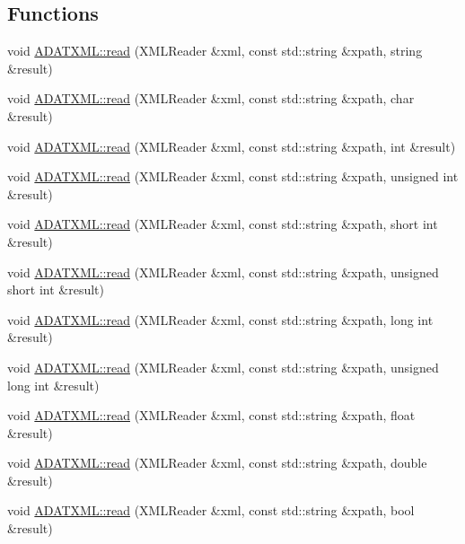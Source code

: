 \subsection*{Functions}
\begin{DoxyCompactItemize}
\item 
void \mbox{\hyperlink{namespaceADATXML_a569ed4d03ded383a8aaf0ce90b7c80ba}{A\+D\+A\+T\+X\+M\+L\+::read}} (X\+M\+L\+Reader \&xml, const std\+::string \&xpath, string \&result)
\item 
void \mbox{\hyperlink{group__io_ga42921d40fdc242e0dc6200a66c1eb928}{A\+D\+A\+T\+X\+M\+L\+::read}} (X\+M\+L\+Reader \&xml, const std\+::string \&xpath, char \&result)
\item 
void \mbox{\hyperlink{group__io_ga0e33dbc1e3ebc33bfb45ef5f1b390e45}{A\+D\+A\+T\+X\+M\+L\+::read}} (X\+M\+L\+Reader \&xml, const std\+::string \&xpath, int \&result)
\item 
void \mbox{\hyperlink{group__io_ga8237b5b121cf20d4d72ebe0396ad5fc7}{A\+D\+A\+T\+X\+M\+L\+::read}} (X\+M\+L\+Reader \&xml, const std\+::string \&xpath, unsigned int \&result)
\item 
void \mbox{\hyperlink{group__io_gac393d0005e4174339c4abaf8a008deac}{A\+D\+A\+T\+X\+M\+L\+::read}} (X\+M\+L\+Reader \&xml, const std\+::string \&xpath, short int \&result)
\item 
void \mbox{\hyperlink{group__io_ga8fe4b50be5b1bd3e2bfb094b7c158c06}{A\+D\+A\+T\+X\+M\+L\+::read}} (X\+M\+L\+Reader \&xml, const std\+::string \&xpath, unsigned short int \&result)
\item 
void \mbox{\hyperlink{group__io_gac5101b8a4f533a23a99e6ae250648a1d}{A\+D\+A\+T\+X\+M\+L\+::read}} (X\+M\+L\+Reader \&xml, const std\+::string \&xpath, long int \&result)
\item 
void \mbox{\hyperlink{group__io_ga91e3d97bb48b2257dba32262f49d5758}{A\+D\+A\+T\+X\+M\+L\+::read}} (X\+M\+L\+Reader \&xml, const std\+::string \&xpath, unsigned long int \&result)
\item 
void \mbox{\hyperlink{group__io_ga1a88a7d3e3dbac33c732e580f8c23302}{A\+D\+A\+T\+X\+M\+L\+::read}} (X\+M\+L\+Reader \&xml, const std\+::string \&xpath, float \&result)
\item 
void \mbox{\hyperlink{group__io_ga75127d89932656a5224dd747b14ca897}{A\+D\+A\+T\+X\+M\+L\+::read}} (X\+M\+L\+Reader \&xml, const std\+::string \&xpath, double \&result)
\item 
void \mbox{\hyperlink{group__io_ga9309cae5bd0340cc4ed71055808b6fac}{A\+D\+A\+T\+X\+M\+L\+::read}} (X\+M\+L\+Reader \&xml, const std\+::string \&xpath, bool \&result)

\end{DoxyCompactItemize}
